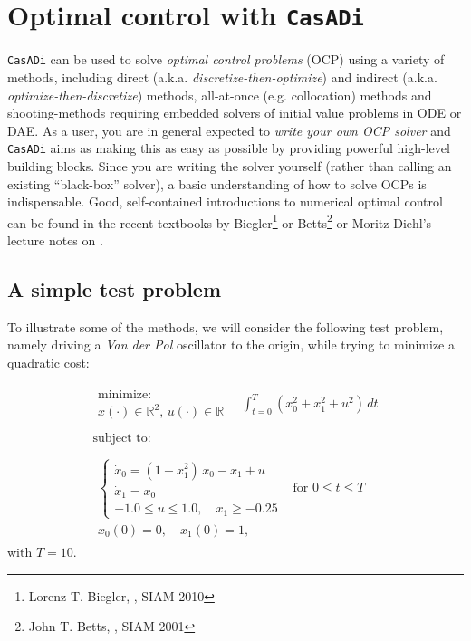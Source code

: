 \documentclass[a4paper,12pt]{book}
\newcommand{\CasADi}{\texttt{CasADi}\xspace}
\begin{document}
\chapter{Optimal control with \CasADi}
\CasADi can be used to solve \emph{optimal control problems} (OCP) using a variety of methods, including direct (a.k.a. \emph{discretize-then-optimize}) and indirect (a.k.a. \emph{optimize-then-discretize}) methods, all-at-once (e.g. collocation) methods and shooting-methods requiring embedded solvers of initial value problems in ODE or DAE. As a user, you are in general expected to \emph{write your own OCP solver} and \CasADi aims as making this as easy as possible by providing powerful high-level building blocks. Since you are writing the solver yourself (rather than calling an existing ``black-box'' solver), a basic understanding of how to solve OCPs is indispensable. Good, self-contained introductions to numerical optimal control can be found in the recent textbooks by Biegler\footnote{Lorenz T. Biegler, \emph{}, SIAM 2010} or Betts\footnote{John T. Betts, \emph{}, SIAM 2001} or Moritz Diehl's lecture notes on .

\section{A simple test problem}
To illustrate some of the methods, we will consider the following test problem,
namely driving a \emph{Van der Pol} oscillator to the origin, while trying to
minimize a quadratic cost:

\begin{equation}
\begin{array}{lc}
\begin{array}{l}
\text{minimize:} \\
x(\cdot) \in \mathbb{R}^2, \, u(\cdot) \in \mathbb{R}
\end{array}
\quad \displaystyle \int_{t=0}^{T}{(x_0^2 + x_1^2 + u^2) \, dt}
\\
\\
\text{subject to:} \\
\\
\begin{array}{ll}
\left\{
\begin{array}{l}
\dot{x}_0 = (1-x_1^2) \, x_0 - x_1 + u \\
\dot{x}_1 = x_0 \\
-1.0 \le u \le 1.0, \quad x_1 \ge -0.25
\end{array} \right. & \text{for $0 \le t \le T$} \\
x_0(0)=0, \quad x_1(0)=1,
\end{array}
\end{array}
\label{eq:vdp}
\end{equation}
with $T=10$.
\end{document}

